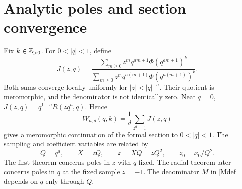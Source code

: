 \documentclass[11pt]{amsart}
\theoremstyle{definition}
\theoremstyle{remark}
\numberwithin{equation}{section}
\begin{document}
\section{Analytic poles and section convergence}
Fix $k\in\mathbb Z_{>0}$. For $0<|q|<1$, define
\begin{equation}\label{Jdef}
 J(z,q)=\frac{\sum_{m\ge0}z^mq^{am+1}\Phi(q^{am+1})^k}
              {\sum_{m\ge0}z^mq^{a(m+1)}\Phi(q^{a(m+1)})^k}.
\end{equation}
Both sums converge locally uniformly for $|z|<|q|^{-a}$. Their quotient is meromorphic, and the denominator is not identically zero. Near $q=0$, $J(z,q)=q^{1-a}R(zq^a,q)$. Hence
\begin{equation}\label{Wanalytic}
 W_{a,d}(q,k)=\frac1d\sum_{z^d=1}J(z,q)
\end{equation}
gives a meromorphic continuation of the formal section to $0<|q|<1$. 
The sampling and coefficient variables are related by
\[
 Q=q^a,\qquad X=zQ,\qquad x=XQ=zQ^2,\qquad z_0=x_0/Q^2.
\]
The first theorem concerns poles in $z$ with $q$ fixed. The radial theorem later concerns poles in $q$ at the fixed sample $z=-1$. The denominator $M$ in \eqref{Mdef} depends on $q$ only through $Q$.
\end{document}
